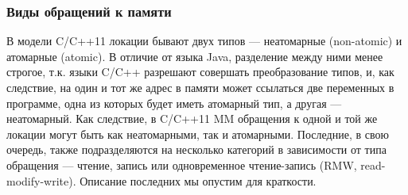 \subsubsection{Виды обращений к памяти}
В модели C/C++11 локации бывают двух типов --- неатомарные (non-atomic) и атомарные (atomic).
В отличие от языка Java, разделение между ними менее строгое,
т.к. языки C/C++ разрешают совершать преобразование типов, и, как следствие,
на один и тот же адрес в памяти может ссылаться две переменных в программе, одна из которых будет
иметь атомарный тип, а другая --- неатомарный.
Как следствие, в C/C++11 MM обращения к одной и той же локации могут быть как неатомарными, так и атомарными.
Последние, в свою очередь, также подразделяются на несколько категорий в зависимости от типа обращения ---
чтение, запись или одновременное чтение-запись (RMW, read-modify-write).
Описание последних мы опустим для краткости.

